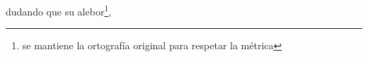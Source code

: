 dudando que su alebor\footnote{\textsuperscript{}se mantiene la ortografía original para respetar la métrica},
